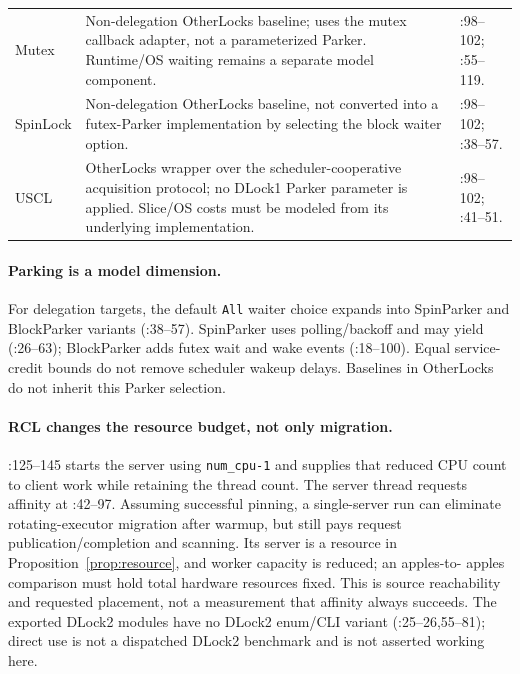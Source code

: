 \begin{longtable}{@{}P{0.14\textwidth}P{0.51\textwidth}P{0.27\textwidth}@{}}
\addlinespace
Mutex & Non-delegation OtherLocks baseline; uses the mutex callback adapter, not a parameterized Parker. Runtime/OS waiting remains a separate model component. & :98--102; :55--119. \\
\addlinespace
SpinLock & Non-delegation OtherLocks baseline, not converted into a futex-Parker implementation by selecting the block waiter option. & :98--102; :38--57. \\
\addlinespace
USCL & OtherLocks wrapper over the scheduler-cooperative acquisition protocol; no DLock1 Parker parameter is applied. Slice/OS costs must be modeled from its underlying implementation. & :98--102; :41--51. \\
\end{longtable}
\normalsize

\paragraph{Parking is a model dimension.}
For delegation targets, the default \texttt{All} waiter choice expands into
SpinParker and BlockParker variants
(:38--57). SpinParker uses polling/backoff and may
yield (:26--63); BlockParker adds futex wait and
wake events (:18--100). Equal service-credit
bounds do not remove scheduler wakeup delays. Baselines in OtherLocks do not
inherit this Parker selection.

\paragraph{RCL changes the resource budget, not only migration.}
:125--145 starts the server using
\texttt{num\_cpu-1} and supplies that reduced CPU count to client work while
retaining the thread count. The server thread requests affinity at
:42--97. Assuming successful pinning, a single-server
run can eliminate rotating-executor migration after warmup, but still pays
request publication/completion and scanning. Its server is a resource in
Proposition~\ref{prop:resource}, and worker capacity is reduced; an apples-to-
apples comparison must hold total hardware resources fixed. This is source
reachability and requested placement, not a measurement that affinity always
succeeds. The exported DLock2  modules have no DLock2 enum/CLI
variant (:25--26,55--81); direct use is not a dispatched
DLock2 benchmark and is not asserted working here.

